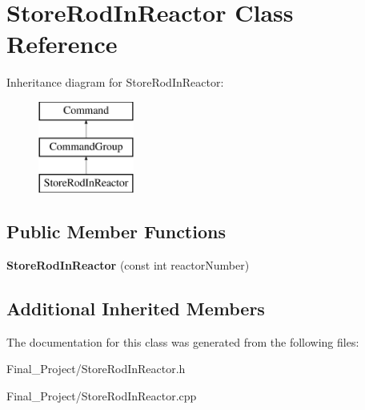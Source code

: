 \hypertarget{classStoreRodInReactor}{\section{Store\-Rod\-In\-Reactor Class Reference}
\label{classStoreRodInReactor}
}
Inheritance diagram for Store\-Rod\-In\-Reactor\-:\begin{figure}[H]
\begin{center}
\leavevmode
\includegraphics[height=3.000000cm]{classStoreRodInReactor}
\end{center}
\end{figure}
\subsection*{Public Member Functions}
\begin{DoxyCompactItemize}
\item 
\hypertarget{classStoreRodInReactor_a1a72a4e2f134e009b8c911efd4ced737}{{\bfseries Store\-Rod\-In\-Reactor} (const int reactor\-Number)}\label{classStoreRodInReactor_a1a72a4e2f134e009b8c911efd4ced737}

\end{DoxyCompactItemize}
\subsection*{Additional Inherited Members}


The documentation for this class was generated from the following files\-:\begin{DoxyCompactItemize}
\item 
Final\-\_\-\-Project/Store\-Rod\-In\-Reactor.\-h\item 
Final\-\_\-\-Project/Store\-Rod\-In\-Reactor.\-cpp\end{DoxyCompactItemize}
